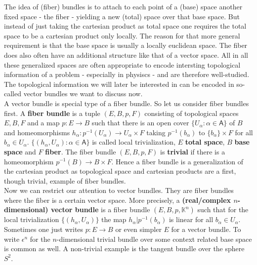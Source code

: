 \nocite{7fc005ba}
\nocite{c7f15065}
The idea of (fiber) bundles is to attach to each point of a (base) space another fixed space - the fiber - yielding a new (total) space over that base space. But instead of just taking the cartesian product as total space one requires the total space to be a cartesian product only locally. The reason for that more general requirement is that the base space is usually a locally euclidean space. The fiber does also often have an additional structure like that of a vector space. All in all these generalized spaces are often appropriate to encode intersting topological information of a problem - especially in physiscs - and are therefore well-studied. The topological information we will later be interested in can be encoded in so-called vector bundles we want to discuss now.
\\
A vector bundle is special type of a fiber bundle. So let us consider fiber bundles first. A \textbf{fiber bundle} is a tuple $(E,B,p,F)$ consisting of topological spaces $E,B,F$ and a map $p \colon E \to B$ such that there is an open cover $\lbrace U_{\alpha} \colon \alpha \in \mathsf{A} \rbrace$ of $B$ and homeomorphisms $h_{\alpha} \colon p^{-1}(U_{\alpha}) \to U_{\alpha} \times F$ taking $p^{-1}(b_{\alpha})$ to $\lbrace b_{\alpha} \rbrace \times F$ for all $b_{\alpha} \in U_{\alpha}$. $\lbrace (h_{\alpha},U_{\alpha}) \colon \alpha \in \mathsf{A} \rbrace$ is called local trivialization, $E$ \textbf{total space}, $B$ \textbf{base space} and $F$ \textbf{fiber}. The fiber bundle $(E,B,p,F)$ is \textbf{trivial} if there is a homeomorphism $p^{-1}(B) \to B \times F$. Hence a fiber bundle is a generalization of the cartesian product as topological space and cartesian products are a first, though trivial, example of fiber bundles.
\\
Now we can restrict our attention to vector bundles. They are fiber bundles where the fiber is a certain vector space. More precisely, a \textbf{(real/complex $n$-dimensional) vector bundle} is a fiber bundle $(E,B,p,\mathbb{K}^{n})$ such that for the local trivialization $\lbrace (h_{\alpha},U_{\alpha}) \rbrace$ the map $h_{\alpha} \vert p^{-1}(b_{\alpha})$ is linear for all $b_{\alpha} \in U_{\alpha}$. Sometimes one just writes $p \colon E \to B$ or even simpler $E$ for a vector bundle. To write $\epsilon^{n}$ for the $n$-dimensional trivial bundle over some context related base space is common as well. A non-trivial example is the tangent bundle over the sphere $S^{2}$.
\\
